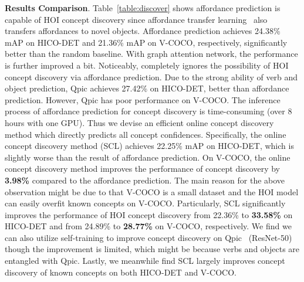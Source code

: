 \documentclass[runningheads]{llncs}
\begin{document}
{\bf Results Comparison}. Table~\ref{table:discover} shows affordance prediction is capable of HOI concept discovery since affordance transfer learning~\cite{hou2021atl} also transfers affordances to novel objects. Affordance prediction achieves 24.38\% mAP on HICO-DET and 21.36\% mAP on V-COCO, respectively, significantly better than the random baseline. With graph attention network, the performance is further improved a bit. Noticeably, \cite{hou2021atl} completely ignores the possibility of HOI concept discovery via affordance prediction. Due to the strong ability of verb and object prediction, Qpic achieves 27.42\% on HICO-DET, better than affordance prediction. However, Qpic has poor performance on V-COCO. The inference process of affordance prediction for concept discovery is time-consuming (over 8 hours with one GPU). Thus we devise an efficient online concept discovery method which directly predicts all concept confidences. Specifically, the online concept discovery method (SCL) achieves 22.25\% mAP on HICO-DET, which is slightly worse than the result of affordance prediction. On V-COCO, the online concept discovery method improves the performance of concept discovery by {\bf 3.98\%} compared to the affordance prediction. The main reason for the above observation might be due to that V-COCO is a  small dataset and the HOI model can easily overfit known concepts on V-COCO.
Particularly, SCL significantly improves the performance of HOI concept discovery from 22.36\% to {\bf 33.58\%} on HICO-DET and from 24.89\% to {\bf 28.77\%} on V-COCO, respectively. We find we can also utilize self-training to improve concept discovery on Qpic~\cite{tamura_cvpr2021} (ResNet-50) though the improvement is limited, which might be because verbs and objects are entangled with Qpic. Lastly, we meanwhile find SCL largely improves concept discovery of known concepts on both HICO-DET and V-COCO.
\end{document}
